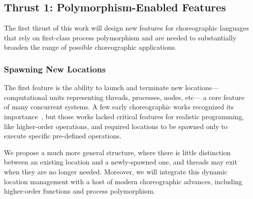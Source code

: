 
\subsection{Thrust 1: Polymorphism-Enabled Features}
\label{sec:t1}

The first thrust of this work will design new features for choreographic languages
that rely on first-class process polymorphism and
are needed to substantially broaden the range of possible choreographic applications.

\subsubsection{Spawning New Locations}
\label{sec:spawning}

The first feature is the ability to launch and terminate new locations---computational units representing threads, processes, nodes, etc---%
a core feature of many concurrent systems.
A few early choreographic works recognized its importance~\citep{CarboneM13,CruzFilipeM16a},
but those works lacked critical features for realistic programming, like higher-order operations,
and required locations to be spawned only to execute specific pre-defined operations.

We propose a much more general structure, where there is little distinction between an existing location and a newly-spawned one,
and threads may exit when they are no longer needed.
Moreover, we will integrate this dynamic location management with a host of modern choreographic advances,
including higher-order functions and process polymorphism.

